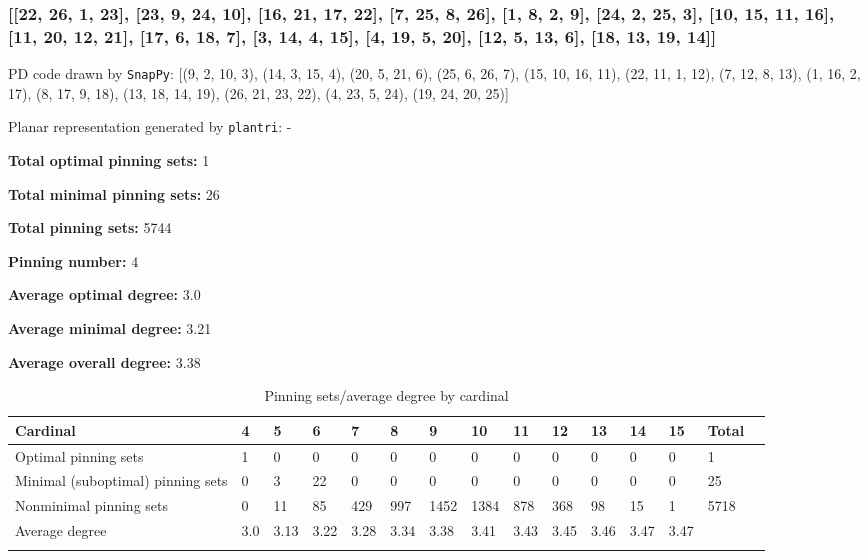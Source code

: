 \documentclass{article}%
\begin{document}
\newpage

\subsubsection{[[22, 26, 1, 23], [23, 9, 24, 10], [16, 21, 17, 22], [7, 25, 8, 26], [1, 8, 2, 9], [24, 2, 25, 3], [10, 15, 11, 16], [11, 20, 12, 21], [17, 6, 18, 7], [3, 14, 4, 15], [4, 19, 5, 20], [12, 5, 13, 6], [18, 13, 19, 14]]}

{\small\noindent PD code drawn by \texttt{SnapPy}: [(9, 2, 10, 3), (14, 3, 15, 4), (20, 5, 21, 6), (25, 6, 26, 7), (15, 10, 16, 11), (22, 11, 1, 12), (7, 12, 8, 13), (1, 16, 2, 17), (8, 17, 9, 18), (13, 18, 14, 19), (26, 21, 23, 22), (4, 23, 5, 24), (19, 24, 20, 25)]}

{\small\noindent Planar representation generated by \texttt{plantri}: -}

\begin{multicols}{2}
{\normalsize \noindent\textbf{Total optimal pinning sets:} 1

\noindent\textbf{Total minimal pinning sets:} 26

\noindent\textbf{Total pinning sets:} 5744

\noindent\textbf{Pinning number:} 4

}
\columnbreak

{\normalsize \noindent\textbf{Average optimal degree:} 3.0

\noindent\textbf{Average minimal degree:} 3.21

\noindent\textbf{Average overall degree:} 3.38

}
\end{multicols}

\begin{table}[ht]
	\caption{Pinning sets/average degree by cardinal}
	\centering
	\renewcommand{\arraystretch}{1.5}
	\begin{tabularx}{\textwidth}{lXXXXXXXXXXXXXX}
		\toprule
			Cardinal & 4 & 5 & 6 & 7 & 8 & 9 & 10 & 11 & 12 & 13 & 14 & 15 & Total\\
			\hline
			Optimal pinning sets & 1 & 0 & 0 & 0 & 0 & 0 & 0 & 0 & 0 & 0 & 0 & 0 & 1 \\
			Minimal (suboptimal) pinning sets & 0 & 3 & 22 & 0 & 0 & 0 & 0 & 0 & 0 & 0 & 0 & 0 & 25 \\
			Nonminimal pinning sets & 0 & 11 & 85 & 429 & 997 & 1452 & 1384 & 878 & 368 & 98 & 15 & 1 & 5718 \\
			Average degree & 3.0 & 3.13 & 3.22 & 3.28 & 3.34 & 3.38 & 3.41 & 3.43 & 3.45 & 3.46 & 3.47 & 3.47 &  \\
		\bottomrule \\ 
	\end{tabularx}
\end{table}
\end{document}
